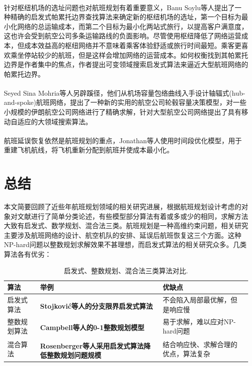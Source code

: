 \documentclass[runningheads]{llncs}
\newcommand{\upcite}[1]{\textsuperscript{\textsuperscript{\cite{#1}}}}
\begin{document}
针对枢纽机场的选址问题也对航班规划有着重要意义，Banu Soylu等人\upcite{ref_article18}提出了一种精确的启发式帕累托边界查找算法来确定新的枢纽机场的选址，第一个目标为最小化网络的总运输成本，而第二个目标为最小化两站式旅行，以提高客户满意度，这也许会受到航空公司多条运输路线的负面影响。尽管使用枢纽降低了网络运营成本，但成本效益高的枢纽网络并不意味着乘客体验舒适或旅行时间最短。乘客更喜欢乘坐停站较少的航班，但是这样会增加网络的运营成本。如何权衡找到其帕累托边界是作者集中的焦点，作者提出可变领域搜索启发式算法来逼近大型航班网络的帕累托边界。

Seyed Sina Mohria等人\upcite{ref_article19}另辟蹊径，他们从机场容量包络曲线入手设计轴辐式(hub-and-spoke)航班网络，提出了一种新的实用的航空公司轮毂容量决策模型，对一些小规模的伊朗航空公司网络进行了精确求解，针对大型航空公司网络提出了具有移动自适应的大领域搜索算法。

航班延误恢复依然是航班规划的重点，Jonathan等人\upcite{ref_article34}使用时间段优化模型，用于重建飞机航线，将飞机重新分配到航班并使成本最小化。

\section{总结}
本文简要回顾了近些年航班规划领域的相关研究进展，根据航班规划设计考虑的对象对文献进行了简单分类论述，有些模型部分算法有着或多或少的相同，求解方法大致有启发式、数学规划、混合法三类。航班规划是一种高维约束问题，相关研究主要涉及航班网络的设计、航空机队的安排、延误后航班恢复这三个方面。这种NP-hard问题以整数规划求解效果不甚理想，而启发式算法的相关研究众多。几类算法各有优劣：

\begin{table}
\centering
\begin{tabular}{lp{6cm}p{3cm}p{3cm}}
\hline
算法 &  举例 & 优缺点\\
\hline
启发式算法 &  {\bfseries Stojković等人\upcite{ref_article26}的分支限界启发式算法} & 不会陷入局部最优解，但是响应慢\\
整数规划算法 &  {\bfseries Campbell等人\upcite{ref_article20}的0-1整数规划模型} & 易于求解，难以应对NP-hard问题\\
混合算法 & {\bfseries Rosenberger等人\upcite{ref_article30}采用启发式算法降低整数规划问题规模} & 结合响应快、求解合理的优点，算法复杂\\
\hline
\end{tabular}
\caption{启发式、整数规划、混合法三类算法对比.}\label{tab1}
\end{table}
\end{document}
